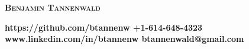 \documentclass[line]{letter}
\begin{document}
{ \begin{center}\huge \textsc{\textbf{Benjamin Tannenwald}} \end{center}}%
{\bf \normalsize https://github.com/btannenw \hfill +1-614-648-4323\\} 
{\bf \normalsize www.linkedin.com/in/btannenw \hfill btannenwald@gmail.com\vspace*{-.15in}}

\noindent{\rule{\textwidth}{1.5pt}}

\end{document}
